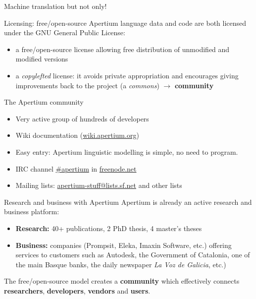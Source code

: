 \documentclass[final]{beamer} %
\newlength{\wideitemsep}
\let\olditem\item
\renewcommand{\item}{\setlength{\itemsep}{\wideitemsep}\olditem}
\begin{document}
\begin{frame}
\begin{columns}
\begin{column}{0.5\textwidth}
\begin{block}{Machine translation but not only!}
\end{block}

\begin{block}{Licensing: free/open-source}
Apertium language data and code are both licensed under the GNU General Public License:\begin{itemize}
\item a free/open-source license allowing free distribution of unmodified and modified versions
\item a \textit{copylefted} license: it avoids private appropriation and encourages giving improvements back to the project (a \textit{commons}) \(\to\) \textbf{community}
\end{itemize}
\end{block}

\begin{block}{The Apertium community}
\begin{itemize}
\item Very active group of hundreds of developers 
\item Wiki documentation (\url{wiki.apertium.org})
\item Easy entry: Apertium linguistic modelling is simple, no need to program.
\item IRC channel \url{\#apertium} in \url{freenode.net}
\item Mailing lists: \url{apertium-stuff@lists.sf.net} and other lists
\end{itemize}

\end{block}




\begin{block}{Research and business with Apertium}
  Apertium is already an active research and business platform:
  \begin{itemize}
    \item \textbf{Research:} 40+ publications, 2 PhD thesis, 4 master's theses
    \item \textbf{Business:} companies (Prompsit, Eleka,
      Imaxin Software, etc.) offering services to customers such as
      Autodesk, the Government of Catalonia, one of the main Basque
      banks, the daily newspaper \emph{La Voz de Galicia}, etc.)
  \end{itemize}
  The free/open-source model creates a \textbf{community} which effectively
  connects \textbf{researchers}, \textbf{developers}, \textbf{vendors} and \textbf{users}.
\end{block}


\end{column}
\end{columns}
\end{frame}
\end{document}

